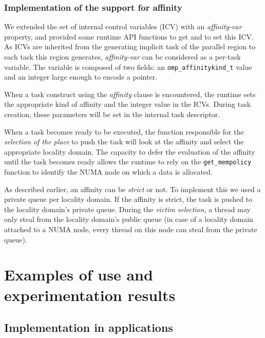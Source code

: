 \documentclass{Styles/llncs}
\newcommand{\TG}[1]{{\color{red}\bfseries TG: #1}}
\begin{document}
\subsubsection{Implementation of the support for affinity}
We extended the set of internal control variables (ICV) with an \textit{affinity-var} property, and provided some runtime API functions to get and to set this ICV. As ICVs are inherited from the generating implicit task of the parallel region to each task this region generates, \textit{affinity-var} can be considered as a per-task variable. The variable is composed of two fields: an \texttt{omp\_affinitykind\_t} value and an integer large enough to encode a pointer.


When a task construct using the \textit{affinity} clause is encountered, the runtime sets the appropriate kind of affinity and the integer value in the ICVs.
During task creation, these parameters will be set in the internal task descriptor.

When a task becomes ready to be executed, the function responsible for the \textit{selection of the place} to push
the task will look at the affinity and select the appropriate locality domain. The capacity to defer the evaluation of the affinity until the task becomes ready allows the runtime to rely on the \verb/get_mempolicy/ function to identify the NUMA node on which a data is allocated.

As described earlier, an affinity can be \emph{strict} or not. To implement this we used
a private queue per locality domain. If the affinity is strict, the task is pushed to the locality domain's private queue.
During the \textit{victim selection}, a thread may only steal from the locality domain's
public queue (in case of a locality domain attached to a NUMA node, every thread on this node can steal from the private queue).

\section{Examples of use and experimentation results}

\subsection{Implementation in applications}
\end{document}
